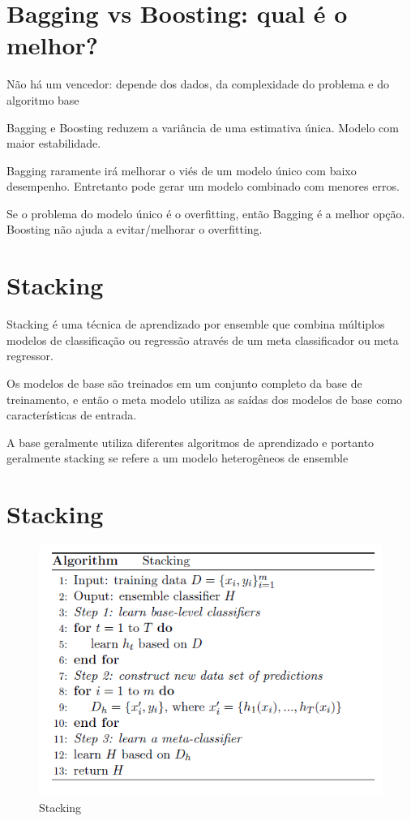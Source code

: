 \documentclass[11pt]{article}
\makeatletter
\def\maxwidth{\ifdim\Gin@nat@width>\linewidth\linewidth
    \else\Gin@nat@width\fi}
\let\Oldincludegraphics\includegraphics
\renewcommand{\includegraphics}[1]{\Oldincludegraphics[width=.8\maxwidth]{#1}}
\makeatother
\begin{document}
    \hypertarget{bagging-vs-boosting-qual-uxe9-o-melhor}{%
\section{Bagging vs Boosting: qual é o
melhor?}\label{bagging-vs-boosting-qual-uxe9-o-melhor}}

Não há um vencedor: depende dos dados, da complexidade do problema e do
algoritmo base

Bagging e Boosting reduzem a variância de uma estimativa única. Modelo
com maior estabilidade.

Bagging raramente irá melhorar o viés de um modelo único com baixo
desempenho. Entretanto pode gerar um modelo combinado com menores erros.

Se o problema do modelo único é o overfitting, então Bagging é a melhor
opção. Boosting não ajuda a evitar/melhorar o overfitting.

    \hypertarget{stacking}{%
\section{Stacking}\label{stacking}}

Stacking é uma técnica de aprendizado por ensemble que combina múltiplos
modelos de classificação ou regressão através de um meta classificador
ou meta regressor.

Os modelos de base são treinados em um conjunto completo da base de
treinamento, e então o meta modelo utiliza as saídas dos modelos de base
como características de entrada.

A base geralmente utiliza diferentes algoritmos de aprendizado e
portanto geralmente stacking se refere a um modelo heterogêneos de
ensemble

    \hypertarget{stacking}{%
\section{Stacking}\label{stacking}}

\begin{figure}
\centering
\includegraphics{figuras/stacking.png}
\caption{Stacking}
\end{figure}
\end{document}
